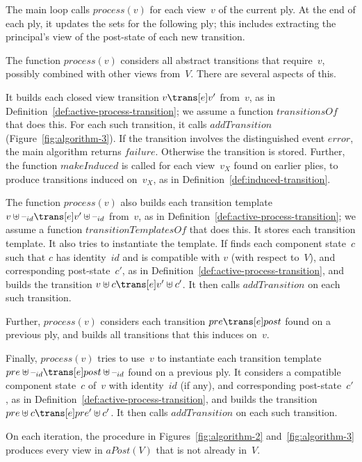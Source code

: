 The main loop calls $process(v)$ for each view~$v$ of the current ply.  At the
end of each ply, it updates the sets for the following ply; this includes
extracting the principal's view of the post-state of each new transition. 

The function $process(v)$ considers all abstract transitions that require~$v$,
possibly combined with other views from~$V$.  There are several aspects of
this. 

It builds each closed view transition $v \trans[e] v'$ from~$v$, as in
Definition~\ref{def:active-process-transition}; we assume a function
$transitionsOf$ that does this.  For each such transition, it calls
$addTransition$ (Figure~\ref{fig:algorithm-3}).  If the transition involves
the distinguished event $error$, the main algorithm returns $failure$.
Otherwise the transition is stored.  Further, the function $makeInduced$ is
called for each view~$v_X$ found on earlier plies, to produce transitions
induced on~$v_X$, as in Definition~\ref{def:induced-transition}.

The function $process(v)$ also builds each transition template $v \uplus
\hole{id} \trans[e] v' \uplus \hole{id}$ from~$v$, as in
Definition~\ref{def:active-process-transition}; we assume a function
$transitionTemplatesOf$ that does this.  It stores each transition template.
It also tries to instantiate the template.  If finds each component state~$c$
such that $c$ has identity~$id$ and is compatible with $v$ (with respect
to~$V$), and corresponding post-state~$c'$, as in
Definition~\ref{def:active-process-transition}, and builds
the transition $v \uplus c \trans[e] v' \uplus c'$.  It then calls
$addTransition$ on each such transition.

Further, $process(v)$ considers each transition $pre \trans[e] post$ found on
a previous ply, and builds all transitions that this induces on~$v$.

Finally, $process(v)$ tries to use~$v$ to instantiate each transition template
$pre \uplus \hole{id} \trans[e] post \uplus \hole{id}$ found on a previous
ply.  It considers a compatible component state~$c$ of~$v$ with identity~$id$
(if any), and corresponding post-state~$c'$, as in
Definition~\ref{def:active-process-transition}, and builds the transition $pre
\uplus c \trans[e] pre' \uplus c'$.  It then calls $addTransition$ on each
such transition.


\begin{lemma}
On each iteration, the procedure in Figures~\ref{fig:algorithm-2}
and~\ref{fig:algorithm-3} produces every view in $aPost(V)$ that is not
already in~$V$.
\end{lemma}

